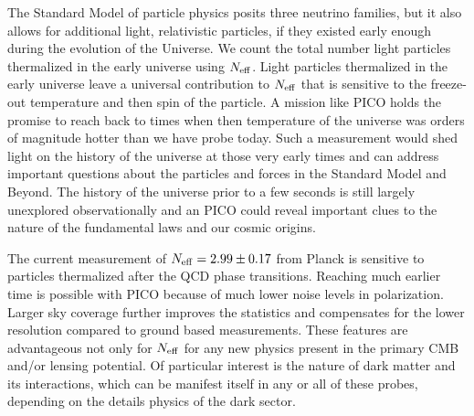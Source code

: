 \documentclass[PICOReport.tex]{subfiles}
\begin{document}
The Standard Model of particle physics posits three neutrino families, but it also allows for additional light, relativistic particles, if 
they existed early enough during the evolution of the Universe.   We count the total number 
light particles thermalized in the early universe using ${N_{\rm eff}}$. Light particles thermalized in the early universe leave a universal contribution to ${N_{\rm eff}}$ that is sensitive to the freeze-out temperature and then spin of the particle.  A mission like PICO holds the promise to reach 
back to times when then temperature of the universe was orders of magnitude hotter than we have probe today.  
Such a measurement would shed light on the history of the universe at those very early times and can address 
important questions about the particles and forces in the Standard Model and Beyond.  The history of the universe prior to a few seconds is still largely unexplored observationally and an PICO could reveal important clues to the nature of the fundamental laws and our cosmic origins.

The current measurement of ${N_{\rm eff}} = 2.99 \pm 0.17$ from Planck is sensitive to particles thermalized after the QCD phase transitions.  Reaching much earlier time is possible with PICO because of much lower noise levels in polarization.  Larger sky coverage further improves the statistics and compensates for the lower resolution compared to ground based measurements.  These features are advantageous not only for ${N_{\rm eff}}$ for any new physics present in the primary CMB and/or lensing potential.  Of particular interest is the nature of dark matter and its interactions, which can be manifest itself in any or all of these probes, depending on the details physics of the dark sector. 


\end{document}
